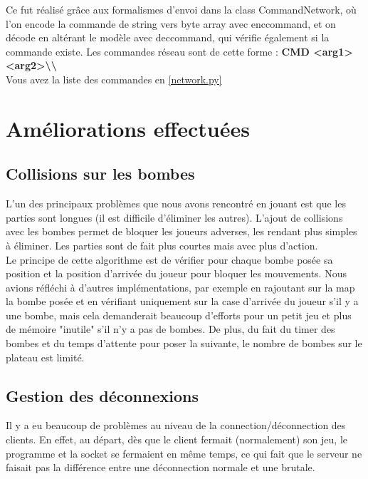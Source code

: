 \documentclass[a4paper]{article}
\begin{document}
		Ce fut réalisé grâce aux formalismes d'envoi dans la class CommandNetwork, où l'on encode la commande de string vers byte array avec enc\textunderscore command, et on décode en altérant le modèle avec dec\textunderscore command, qui vérifie également si la commande existe. Les commandes réseau sont de cette forme :
		\textbf{CMD <arg1> <arg2>\textbackslash\textbackslash}
		\\

		Vous avez la liste des commandes en \ref{network.py}

	\section{Améliorations effectuées}
		\subsection{Collisions sur les bombes}
		L'un des principaux problèmes que nous avons rencontré en jouant est que les parties sont longues (il est difficile d'éliminer les autres).
		L'ajout de collisions avec les bombes permet de bloquer les joueurs adverses, les rendant plus simples à éliminer.
		Les parties sont de fait plus courtes mais avec plus d'action.
		\\

		Le principe de cette algorithme est de vérifier pour chaque bombe posée sa position et la position d'arrivée du joueur pour bloquer les mouvements. Nous avions réfléchi à d'autres implémentations, par exemple en rajoutant sur la map la bombe posée et en vérifiant uniquement sur la case d'arrivée du joueur s'il y a une bombe, mais cela demanderait beaucoup d'efforts pour un petit jeu et plus de mémoire "inutile" s'il n'y a pas de bombes. De plus, du fait du timer des bombes et du temps d'attente pour poser la suivante, le nombre de bombes sur le plateau est limité.

		

		\subsection{Gestion des déconnexions}

		Il y a eu beaucoup de problèmes au niveau de la connection/déconnection des clients. En effet, au départ, dès que le client fermait (normalement) son jeu, le programme et la socket se fermaient en même temps, ce qui fait que le serveur ne faisait pas la différence entre une déconnection normale et une brutale.
\end{document}
